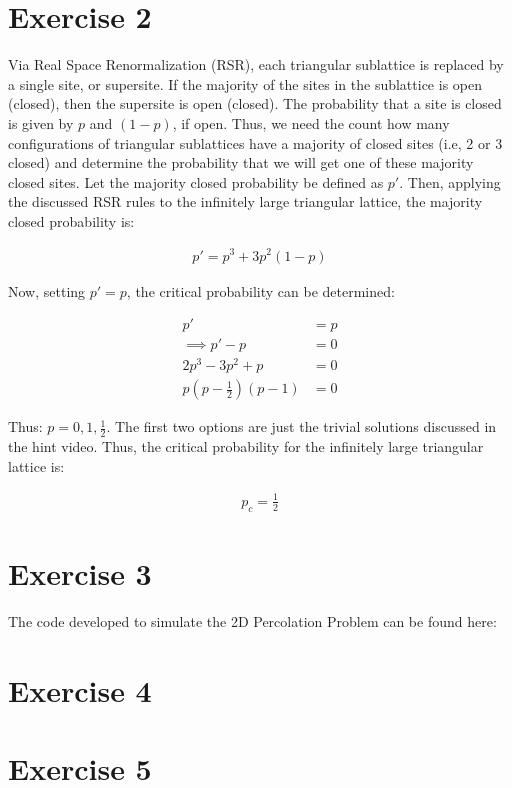 \documentclass{article}
\begin{document}
\section{Exercise 2}

Via Real Space Renormalization (RSR), each triangular sublattice is replaced by a single site, or supersite. If the majority of the sites in the sublattice is open (closed), then the supersite is open (closed). The probability that a site is closed is given by $p$ and $(1-p)$, if open. Thus, we need the count how many configurations of triangular sublattices have a majority of closed sites (i.e, 2 or 3 closed) and determine the probability that we will get one of these majority closed sites. Let the majority closed probability be defined as $p'$. Then, applying the discussed RSR rules to the infinitely large triangular lattice, the majority closed probability is:

\begin{align}
p' = p^3 + 3p^2(1-p)
\end{align}

Now, setting $p'=p$, the critical probability can be determined:

\begin{align}
p' &= p \\
\implies p' - p &= 0 \\
2p^3 - 3p^2 + p &= 0 \\
p(p-\frac{1}{2})(p-1) &= 0
\end{align}

Thus: $p=0,1,\frac{1}{2}$. The first two options are just the trivial solutions discussed in the hint video. Thus, the critical probability for the infinitely large triangular lattice is:

\begin{align}
p_c = \frac{1}{2}
\end{align}

\section{Exercise 3}

The code developed to simulate the 2D Percolation Problem can be found here: \url{}


\section{Exercise 4}
\section{Exercise 5}
\end{document}
